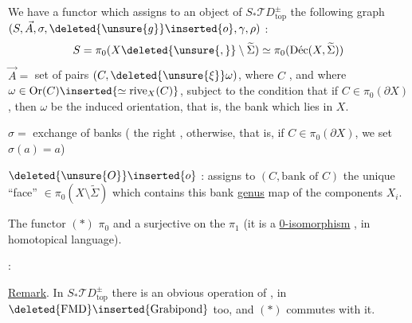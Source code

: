 We have a functor
which assigns to an object  of
$S_*\mathcal TD^\pm_{\mathrm{top}}$ the following  graph
$(S,\vec A,\sigma,\deleted{\unsure{g}}\inserted{o},\gamma,\rho)$ :
\[
S=\pi_0(X\deleted{\unsure{,}}\setminus\widetilde\Sigma)\simeq\pi_0(\text{Déc}(X,\widetilde\Sigma))
\]
$\vec A=$ set of pairs $(C,\deleted{\unsure{\xi}}\omega)$, where
$C$ , and where
$\omega\in\mathrm{Or}(C)\inserted{\simeq\mathrm{rive}_X(C)}$,
subject to the condition that if $C\in\pi_0(\partial X)$, then $\omega$
be the induced orientation, that is, the bank which lies in $X$.

$\sigma=$ exchange of banks ( the right ,
otherwise, that is, if $C\in\pi_0(\partial X)$, we set $\sigma(a)=a$)

$\deleted{\unsure{O}}\inserted{o}$ : assigns to $(C,\text{bank of }C)$
the unique ``face'' $\in\pi_0(X\setminus\widetilde\Sigma)$ which
contains this bank 
\uline{genus} map of the components $X_i$.

The functor $(*)$ 
 $\pi_0$ and a surjective
on the $\pi_1$ (it is a \uline{0-isomorphism} ,
in homotopical language).

 :

\uline{Remark}. In $S_*\mathcal TD^\pm_{\mathrm{top}}$ there is an
obvious operation of  \uline{},
in $\deleted{\mathrm{FMD}}\inserted{\mathrm{Grabipond}}$ too,
and $(*)$ commutes with it.
